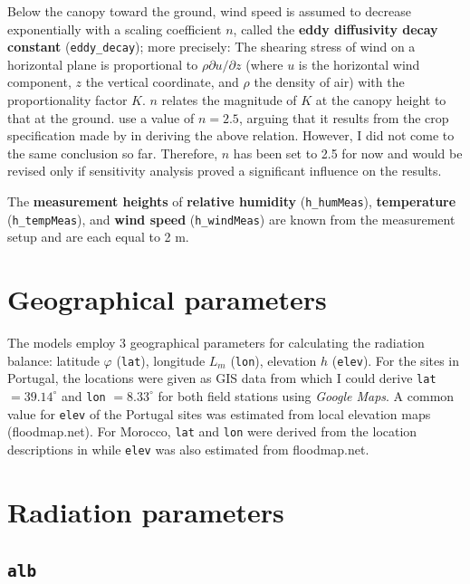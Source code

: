 \documentclass{scrreprt}
\begin{document}
Below the canopy toward the ground, wind speed is assumed to decrease exponentially with a scaling coefficient $n$, called the \textbf{eddy diffusivity decay constant} (\verb!eddy_decay!); more precisely:
The shearing stress of wind on a horizontal plane is proportional to $\rho \partial u / \partial z$ (where $u$ is the horizontal wind component, $z$ the vertical coordinate, and $\rho$ the density of air) with the proportionality factor $K$.
$n$ relates the magnitude of $K$ at the canopy height to that at the ground.
\citet{shuttleworth85} use a value of $n = 2.5$, arguing that it results from the crop specification made by \citet{monteith73} in deriving the above relation.
However, I did not come to the same conclusion so far.
Therefore, $n$ has been set to 2.5 for now and would be revised only if sensitivity analysis proved a significant influence on the results.

The \textbf{measurement heights} of \textbf{relative humidity} (\verb!h_humMeas!), \textbf{temperature} (\verb!h_tempMeas!), and \textbf{wind speed} (\verb!h_windMeas!) are known from the measurement setup and are each equal to 2 m.


\section{Geographical parameters} \label{sec:parest_geo}

The models employ 3 geographical parameters for calculating the radiation balance: latitude $\varphi$ (\verb!lat!), longitude $L_m$ (\verb!lon!), elevation $h$ (\verb!elev!). For the sites in Portugal, the locations were given as GIS data from which I could derive \verb!lat! $= 39.14^\circ$ and \verb!lon! $= 8.33^\circ$ for both field stations using \emph{Google Maps}. A common value for \verb!elev! of the Portugal sites was estimated from local elevation maps (floodmap.net). For Morocco, \verb!lat! and \verb!lon! were derived from the location descriptions in \citet{mroos14} while \verb!elev! was also estimated from floodmap.net.

\section{Radiation parameters} \label{sec:parest_rad}

\subsection{\texttt{alb}} \label{ssec:parest_rad_alb}
\end{document}
